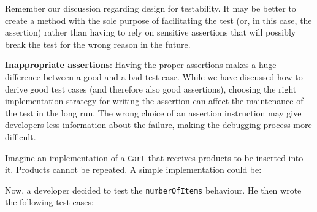 Remember our discussion regarding design for testability. It may be
better to create a method with the sole purpose of facilitating the test
(or, in this case, the assertion) rather than having to rely on
sensitive assertions that will possibly break the test for the wrong
reason in the future.

\textbf{Inappropriate assertions}: Having the proper assertions makes a
huge difference between a good and a bad test case. While we have
discussed how to derive good test cases (and therefore also good
assertions), choosing the right implementation strategy for writing the
assertion can affect the maintenance of the test in the long run. The
wrong choice of an assertion instruction may give developers less
information about the failure, making the debugging process more
difficult.

Imagine an implementation of a \texttt{Cart} that receives products to
be inserted into it. Products cannot be repeated. A simple
implementation could be:

\begin{Shaded}
\begin{Highlighting}[]
 
      \NormalTok{\textless{}} \NormalTok{\textless{}\textgreater{}();}

      \NormalTok{(}
\NormalTok{    \}}

      \NormalTok{() \{}
        \NormalTok{();}
\NormalTok{    \}}
\NormalTok{\}}
\end{Highlighting}
\end{Shaded}

Now, a developer decided to test the \texttt{numberOfItems} behaviour.
He then wrote the following test cases:

